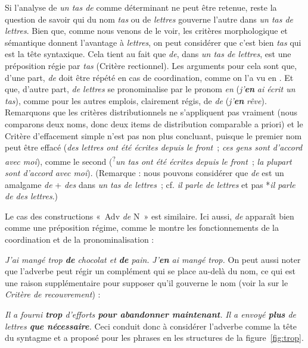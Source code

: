 {    Si l’analyse de \textit{un tas de} comme déterminant ne peut être retenue, reste la question de savoir qui du nom \textit{tas} ou de \textit{lettres} gouverne l’autre dans \textit{un tas de lettres}. Bien que, comme nous venons de le voir, les critères morphologique et sémantique donnent l’avantage à \textit{lettres}, on peut considérer que c’est bien \textit{tas} qui est la tête syntaxique. Cela tient au fait que \textit{de}, dans \textit{un tas de lettres}, est une préposition régie par \textit{tas} (Critère rectionnel). Les arguments pour cela sont que, d’une part, \textit{de} doit être répété en cas de coordination, comme on l’a vu en . Et que, d’autre part, \textit{de lettres} se pronominalise par le pronom \textit{en} (\textit{j’}\textbf{\textit{en}} \textit{ai écrit un tas}), comme pour les autres emplois, clairement régis, de \textit{de} (\textit{j’}\textbf{\textit{en}} \textit{rêve}). Remarquons que les critères distributionnels ne s’appliquent pas vraiment (nous comparons deux noms, donc deux items de distribution comparable a priori) et le Critère d’effacement simple n’est pas non plus concluant, puisque le premier nom peut être effacé (\textit{des lettres ont été écrites depuis le front~}; \textit{ces gens sont d’accord} \textit{avec moi}), comme le second (\textsuperscript{?}\textit{un tas ont été écrites depuis le front~}; \textit{la plupart sont d’accord} \textit{avec moi}). (Remarque : nous pouvons considérer que \textit{de} est un amalgame \textit{de} + \textit{des} dans \textit{un tas de lettres~}; cf. \textit{il parle de lettres} et pas *\textit{il parle de des lettres}.)

    Le cas des constructions «~Adv \textit{de} N~» est similaire. Ici aussi, \textit{de} apparaît bien comme une préposition régime, comme le montre les fonctionnements de la coordination et de la pronominalisation :
    
    \ea\label{ex:trop}
      \ea \textit{{J’ai mangé trop} \textbf{{de}} {chocolat et} \textbf{{de}}  {pain.}}
      \ex \textit{{J’}\textbf{{en}} ai mangé trop.}
      \z
    \z
    On peut aussi noter que l’adverbe peut régir un complément qui se place au-delà du nom, ce qui est une raison supplémentaire pour supposer qu’il gouverne le nom (voir la  sur le \textit{Critère de recouvrement}) :
    
    \ea
      \ea \textit{{Il a fourni} \textbf{{trop}}  {d’efforts} \textbf{{pour abandonner maintenant}}.}
      \ex \textit{{Il a envoyé} \textbf{{plus}}  {de lettres} \textbf{{que nécessaire}}.}
      \z
    \z
    Ceci conduit donc à considérer l’adverbe comme la tête du syntagme et a proposé pour les phrases en  les structures de la figure~\ref{fig:trop}.

}
